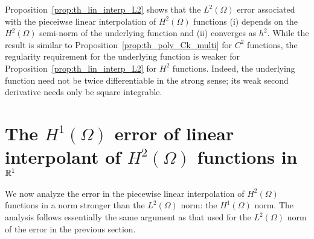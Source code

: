 Proposition~\ref{prop:th_lin_interp_L2} shows that the $L^2(\Omega)$ error associated with the pieceiwse linear interpolation of $H^2(\Omega)$ functions (i) depends on the $H^2(\Omega)$ semi-norm of the underlying function and (ii) converges as $h^2$. While the result is similar to Proposition~\ref{prop:th_poly_Ck_multi} for $C^2$ functions, the regularity requirement for the underlying function is weaker for Proposition~\ref{prop:th_lin_interp_L2} for $H^2$ functions.  Indeed, the underlying function need not be twice differentiable in the strong sense; its weak second derivative needs only be square integrable.


\section{The $H^1(\Omega)$ error of linear interpolant of $H^2(\Omega)$ functions in $\mathbb{R}^1$}
\label{sec:th_interp_h1_h2}
  We now analyze the error in the piecewise linear interpolation of $H^2(\Omega)$ functions in a norm stronger than the $L^2(\Omega)$ norm: the $H^1(\Omega)$ norm.  The analysis follows essentially the same argument as that used for the $L^2(\Omega)$ norm of the error in the previous section.
